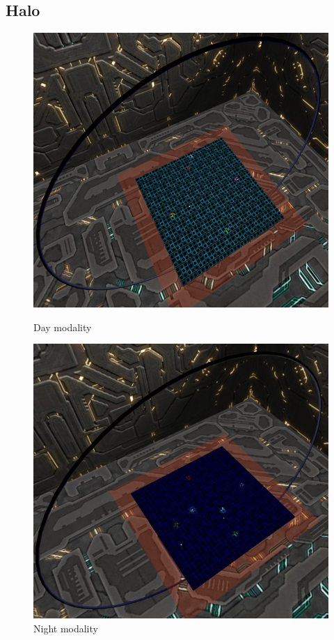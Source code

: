 \documentclass[11pt]{article}
\begin{document}
\subsection{Halo}

\begin{figure}
	\centering
	\begin{minipage}[b]{0.45\linewidth}
		\includegraphics[width=\linewidth]{giorno}
		\caption{Day modality}
	\end{minipage}
	\hfill
	\begin{minipage}[b]{0.45\linewidth}
		\includegraphics[width=\linewidth]{notte}
		\caption{Night modality}
	\end{minipage}
\end{figure}
\end{document}

